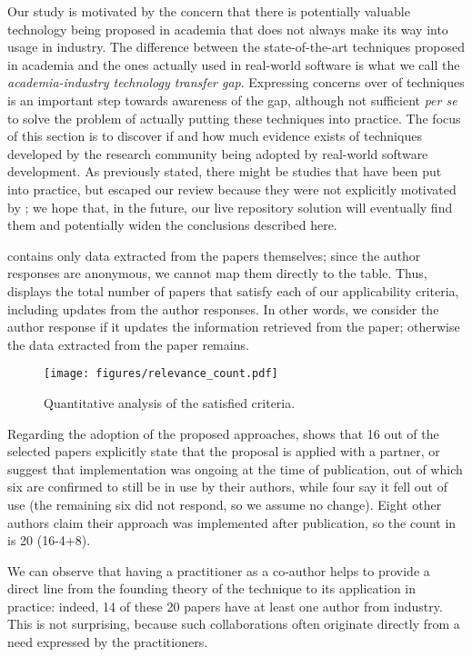 Our study is motivated by the concern that there is potentially valuable technology being proposed in academia that does not always make its way into usage in industry.
The difference between the state-of-the-art techniques proposed in academia and the ones actually used in real-world software is what we call the \emph{academia-industry technology transfer gap}.
Expressing concerns over \rea of \rt techniques is an important step towards awareness of the gap, although not sufficient \textit{per se} to solve the problem of actually putting these techniques into practice.
The focus of this section is to discover if and how much evidence exists of techniques developed by the research community being adopted by real-world software development.
As previously stated, there might be studies that have been put into practice, but escaped our review because they were not explicitly motivated by \rea; we hope that, in the future, our live repository solution will eventually find them and potentially widen the conclusions described here.

 contains only data extracted from the papers themselves; since the author responses are anonymous, we cannot map them directly to the table.
Thus,~ displays the total number of papers that satisfy each of our applicability criteria, including updates from the author responses.
In other words, we consider the author response if it updates the information retrieved from the paper; otherwise the data extracted from the paper remains.

\begin{figure}
  \center
  \texttt{[image: figures/relevance\_count.pdf]}
  \caption{Quantitative analysis of the satisfied criteria.}
  \label{fig:relevance_count}
\end{figure}


Regarding the adoption of the proposed approaches,  shows that 16 out of the \numpapers selected papers explicitly state that the proposal is applied with a partner, or suggest that implementation was ongoing at the time of publication, out of which six are confirmed to still be in use by their authors, while four say it fell out of use (the remaining six did not respond, so we assume no change).
Eight other authors claim their approach was implemented after publication, so the count in~ is 20 (16-4+8).

We can observe that having a practitioner as a co-author helps to provide a direct line from the founding theory of the technique to its application in practice: 
indeed, 14 of these 20 papers have at least one author from industry.
This is not surprising, because such collaborations often originate directly from a need expressed by the practitioners.

